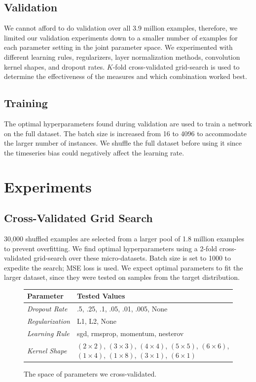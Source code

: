 \documentclass{article}
\begin{document}
\subsection{Validation}

We cannot afford to do validation over all 3.9 million examples, therefore, we limited our validation experiments down to a smaller number of examples for each parameter setting in the joint parameter space.  We experimented with different learning rules, regularizers, layer normalization methods, convolution kernel shapes, and dropout rates.  $K$-fold cross-validated grid-search is used to determine the effectiveness of the measures and which combination worked best.

\subsection{Training}

The optimal hyperparameters found during validation are used to train a network on the full dataset.  The batch size is increased from 16 to 4096 to accommodate the larger number of instances.  We shuffle the full dataset before using it since the timeseries bias could negatively affect the learning rate.

\section{Experiments}

\subsection{Cross-Validated Grid Search}

30,000 shuffled examples are selected from a larger pool of 1.8 million examples to prevent overfitting.  We find optimal hyperparameters using a 2-fold cross-validated grid-search over these micro-datasets.  Batch size is set to 1000 to expedite the search; MSE loss is used.  We expect optimal parameters to fit the larger dataset, since they were tested on samples from the target distribution.

\begin{figure}[ht]
\centering
\begin{tabular}{|l|l|}
\hline
\textbf{Parameter} & \textbf{Tested Values} \\
\hline
\textit{Dropout Rate} &  .5, .25, .1, .05, .01, .005, None \\
\textit{Regularization} &  L1, L2, None \\
\textit{Learning Rule} & sgd, rmsprop, momentum, nesterov \\
\textit{Kernel Shape} & $(2\times 2)$, $(3\times 3)$, $(4\times 4)$, $(5\times 5)$, $(6\times 6)$, $(1\times 4)$, $(1\times 8)$, $(3\times 1)$, $(6\times 1)$ \\
\hline
\end{tabular}
\caption{The space of parameters we cross-validated.}
\end{figure}
\end{document}
